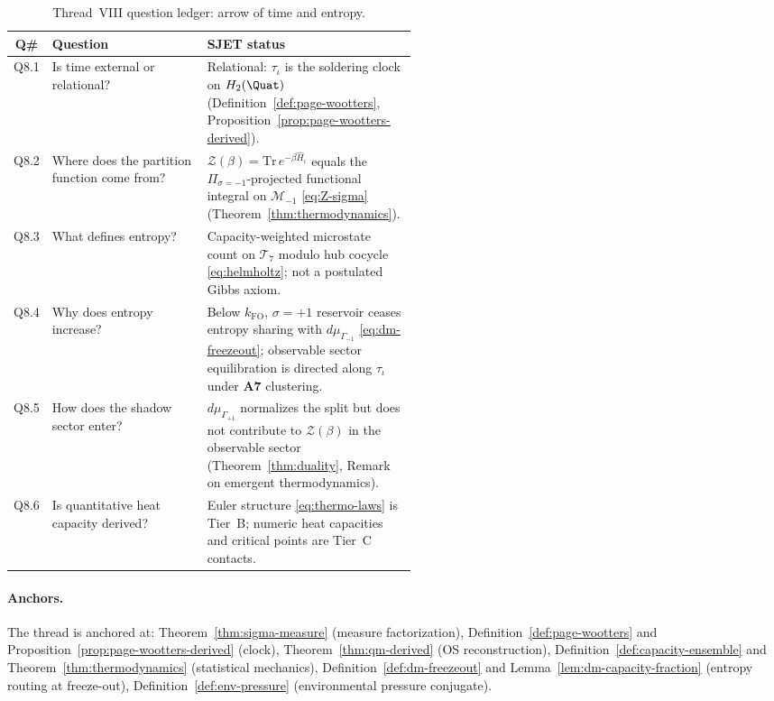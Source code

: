 \begin{table}[ht]
\centering
\small
\renewcommand{\arraystretch}{1.12}
\begin{tabular}{@{}clp{0.52\linewidth}@{}}
\toprule
\textbf{Q\#} & \textbf{Question} & \textbf{SJET status} \\
\midrule
Q8.1 &
  Is time external or relational? &
  Relational: $\tau_\iota$ is the soldering clock on $H_2(\Quat)$
  (Definition~\ref{def:page-wootters},
  Proposition~\ref{prop:page-wootters-derived}). \\
\addlinespace
Q8.2 &
  Where does the partition function come from? &
  $\mathcal{Z}(\beta)=\mathrm{Tr}\,e^{-\beta\hat H_\iota}$ equals the
  $\Pi_{\sigma=-1}$-projected functional integral on
  $\mathcal{M}_{-1}$ \eqref{eq:Z-sigma}
  (Theorem~\ref{thm:thermodynamics}). \\
\addlinespace
Q8.3 &
  What defines entropy? &
  Capacity-weighted microstate count on $\mathcal{T}_7$ modulo hub cocycle
  \eqref{eq:helmholtz}; not a postulated Gibbs axiom. \\
\addlinespace
Q8.4 &
  Why does entropy increase? &
  Below $k_{\mathrm{FO}}$, $\sigma=+1$ reservoir ceases entropy sharing with
  $d\mu_{\Gamma_{-1}}$ \eqref{eq:dm-freezeout}; observable sector
  equilibration is directed along $\tau_\iota$ under \textbf{A7} clustering. \\
\addlinespace
Q8.5 &
  How does the shadow sector enter? &
  $d\mu_{\Gamma_{+1}}$ normalizes the split but does not contribute to
  $\mathcal{Z}(\beta)$ in the observable sector
  (Theorem~\ref{thm:duality}, Remark on emergent thermodynamics). \\
\addlinespace
Q8.6 &
  Is quantitative heat capacity derived? &
  Euler structure \eqref{eq:thermo-laws} is Tier~B; numeric heat capacities
  and critical points are Tier~C contacts. \\
\bottomrule
\end{tabular}
\caption{Thread~VIII question ledger: arrow of time and entropy.}
\label{tab:thread-8-questions}
\end{table}

\paragraph{Anchors.}
The thread is anchored at:
Theorem~\ref{thm:sigma-measure} (measure factorization),
Definition~\ref{def:page-wootters} and Proposition~\ref{prop:page-wootters-derived}
(clock),
Theorem~\ref{thm:qm-derived} (OS reconstruction),
Definition~\ref{def:capacity-ensemble} and Theorem~\ref{thm:thermodynamics}
(statistical mechanics),
Definition~\ref{def:dm-freezeout} and Lemma~\ref{lem:dm-capacity-fraction}
(entropy routing at freeze-out),
Definition~\ref{def:env-pressure} (environmental pressure conjugate).

